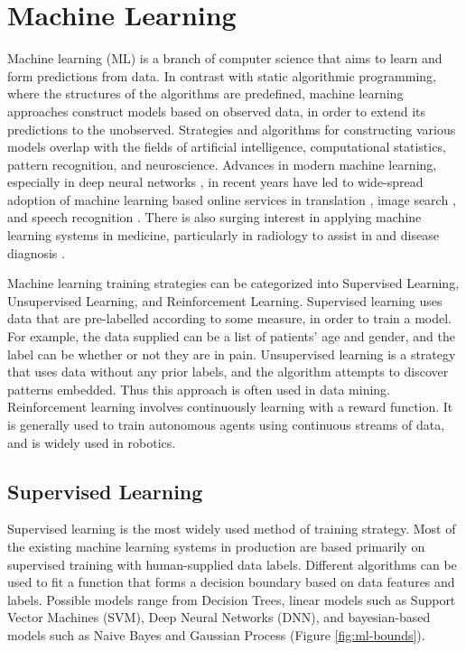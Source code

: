 \section{Machine Learning}
Machine learning (ML) is a branch of computer science that aims to learn and form predictions from data. In contrast with static algorithmic programming, where the structures of the algorithms are predefined, machine learning approaches construct models based on observed data, in order to extend its predictions to the unobserved. Strategies and algorithms for constructing various models overlap with the fields of artificial intelligence, computational statistics, pattern recognition, and neuroscience. Advances in modern machine learning, especially in deep neural networks \cite{LeCun2015}, in recent years have led to wide-spread adoption of machine learning based online services in translation \cite{Bahdanau2014a}, image search \cite{simonyan2014very}, and speech recognition \cite{graves2013speech}. There is also surging interest in applying machine learning systems in medicine, particularly in radiology to assist in and disease diagnosis \cite{Kamnitsas2016,Suk2014}.

Machine learning training strategies can be categorized into Supervised Learning, Unsupervised Learning, and Reinforcement Learning. Supervised learning uses data that are pre-labelled according to some measure, in order to train a model. For example, the data supplied can be a list of patients' age and gender, and the label can be whether or not they are in pain. Unsupervised learning is a strategy that uses data without any prior labels, and the algorithm attempts to discover patterns embedded. Thus this approach is often used in data mining. Reinforcement learning involves continuously learning with a reward function. It is generally used to train autonomous agents using continuous streams of data, and is widely used in robotics.

\subsection{Supervised Learning}
Supervised learning is the most widely used method of training strategy. Most of the existing machine learning systems in production are based primarily on supervised training with human-supplied data labels. Different algorithms can be used to fit a function that forms a decision boundary based on data features and labels. Possible models range from Decision Trees, linear models such as Support Vector Machines (SVM), Deep Neural Networks (DNN), and bayesian-based models such as Naive Bayes and Gaussian Process (Figure \ref{fig:ml-bounds}).

